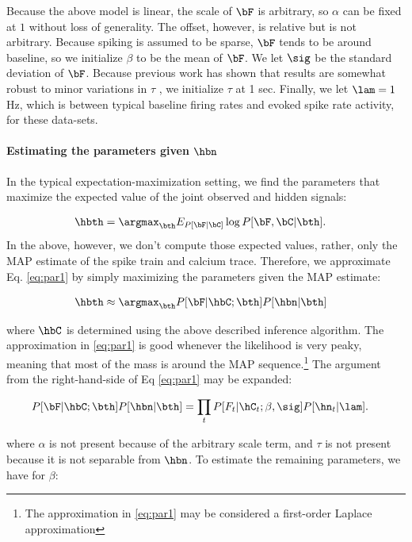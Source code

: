 Because the above model is linear, the scale of $\bF$ is arbitrary, so $\alpha$ can be fixed at $1$ without loss of generality.  The offset, however, is relative but is not arbitrary.  Because spiking is assumed to be sparse, $\bF$ tends to be around baseline, so we initialize $\beta$ to be the mean of $\bF$.  We let $\sig$ be the standard deviation of $\bF$.  Because previous work has shown that results are somewhat robust to minor variations in $\tau$ \cite{YaksiFriedrich06}, we initialize $\tau$ at 1 sec.  Finally, we let $\lam=1$ Hz, which is between typical baseline firing rates and evoked spike rate activity, for these data-sets.

\paragraph{Estimating the parameters given $\hbn$}

In the typical expectation-maximization setting, we find the parameters that maximize the expected value of the joint observed and hidden signals:

\begin{align} \label{eq:par1}
\hbth &= \argmax_{\bth} E_{P[\bF | \bC]} \log P[\bF, \bC | \bth].
\end{align}
In the above, however, we don't compute those expected values, rather, only the MAP estimate of the spike train and calcium trace.  Therefore, we approximate Eq. \eqref{eq:par1} by simply maximizing the parameters given the MAP estimate:

\begin{align} \label{eq:par2}
\hbth &\approx \argmax_{\bth} P[\bF| \hbC; \bth] P[\hbn | \bth]
\end{align}

\noindent where $\hbC$ is determined using the above described inference algorithm. The approximation in \eqref{eq:par1} is good whenever the likelihood is very peaky, meaning that most of the mass is around the MAP sequence.\footnote{The approximation in \eqref{eq:par1} may be considered a first-order Laplace approximation}   The argument from the right-hand-side of Eq \eqref{eq:par1} may be expanded: 

\begin{align} \label{eq:par2}
P[\bF| \hbC; \bth] P[\hbn | \bth] &= \prod_t P[F_t | \hC_t; \beta,\sig]  P[\hn_t | \lam].
\end{align}

\noindent where $\alpha$ is not present because of the arbitrary scale term, and $\tau$ is not present because it is not separable from $\hbn$. To estimate the remaining parameters, we have for $\beta$:

